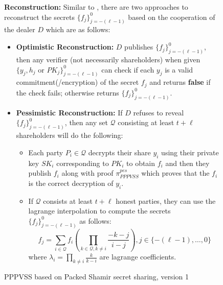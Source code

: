 \begin{figure}[t!]
{\begin{tcolorbox}[title=\textbf{PPPVSS based on Packed Shamir secret sharing \ref{sec:packed-shamir}}, width=1.2\textwidth, colframe=blue!75!black, colback=blue!10, sharp corners]
        \vspace{0.5em}
        \textbf{Reconstruction:}
            Similar to \cite{cryptoeprint:2025/576}, there are two approaches to reconstruct the secrets 
            $\{f_j\}_{j=-(\ell-1)}^0$ based on the cooperation of the dealer $D$ which are as follows:
            \begin{itemize}
                \item \textbf{Optimistic Reconstruction:} $D$ publishes $\{f_j\}_{j=-(\ell-1)}^0$, then any verifier (not necessarily shareholders) 
                when given $\{y_j,h_j\text{ or }PK_j\}_{j=-(\ell-1)}^0$ can check if each $y_j$ is a valid commitment(/encryption) 
                of the secret $f_j$ and returns \textbf{false} if the check fails; otherwise returns 
                $\{f_j\}_{j=-(\ell-1)}^0$.
                \item \textbf{Pessimistic Reconstruction:} If $D$ refuses to reveal $\{f_j\}_{j=-(\ell-1)}^0$, then any set 
                $\mathcal{Q}$ consisting at least $t+\ell$ shareholders will do the following:
                \begin{itemize}
                    \item Each party $P_i\in\mathcal{Q}$ decrypts their share $y_i$ using their private key $SK_i$ 
                      corresponding to $PK_i$ to obtain $f_i$ and then they publish $f_i$ 
                      along with proof $\pi_{PPPVSS}^{pes}$ which proves that the $f_i$ is the correct 
                      decryption of $y_i$.
                    \item If $\mathcal{Q}$ consists at least $t+\ell$ honest parties, they can use the 
                    lagrange interpolation to compute the secrets $\{f_j\}_{j=-(\ell-1)}^0$ as follows:
                    $$    \textstyle f_j = \sum_{i\in \mathcal{Q}} f_i (\prod_{k\in \mathcal{Q}, k\neq i}\frac{-k-j}{i-j}), j\in\{-(\ell-1),\dots,0\} $$
                    where $\lambda_i=\prod_{k\neq i}\frac{k}{k-i}$ are lagrange coefficients.
                \end{itemize}
            \end{itemize}
    \end{tcolorbox}
    }
    \caption[PPPVSS Scheme]{PPPVSS based on Packed Shamir secret sharing, version 1}
    \label{fig:version-packed-shamir-PPPVSS}
\end{figure}